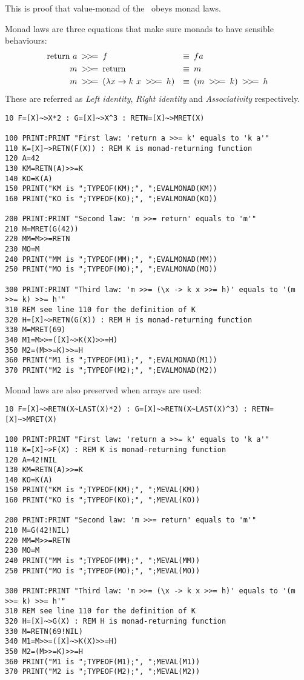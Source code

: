 This is proof that value-monad of the \tbas\ obeys monad laws.

Monad laws are three equations that make sure monads to have sensible behaviours:
\begin{align*}
\text{return}\ a \text{\enskip\basicmbind\enskip}& f &\equiv&\enskip f a\\
m \text{\enskip\basicmbind\enskip}& \text{return} &\equiv&\enskip m\\
m \text{\enskip\basicmbind\enskip}& (\lambda x \rightarrow k\ x \text{\enskip\basicmbind\enskip} h) &\equiv&\enskip (m \text{\enskip\basicmbind\enskip} k) \text{\enskip\basicmbind\enskip} h
\end{align*}
These are referred as \emph{Left identity}, \emph{Right identity} and \emph{Associativity} respectively.

\begin{lstlisting}
10 F=[X]~>X*2 : G=[X]~>X^3 : RETN=[X]~>MRET(X)

100 PRINT:PRINT "First law: 'return a >>= k' equals to 'k a'"
110 K=[X]~>RETN(F(X)) : REM K is monad-returning function
120 A=42
130 KM=RETN(A)>>=K
140 KO=K(A)
150 PRINT("KM is ";TYPEOF(KM);", ";EVALMONAD(KM))
160 PRINT("KO is ";TYPEOF(KO);", ";EVALMONAD(KO))

200 PRINT:PRINT "Second law: 'm >>= return' equals to 'm'"
210 M=MRET(G(42))
220 MM=M>>=RETN
230 MO=M
240 PRINT("MM is ";TYPEOF(MM);", ";EVALMONAD(MM))
250 PRINT("MO is ";TYPEOF(MO);", ";EVALMONAD(MO))

300 PRINT:PRINT "Third law: 'm >>= (\x -> k x >>= h)' equals to '(m >>= k) >>= h'"
310 REM see line 110 for the definition of K
320 H=[X]~>RETN(G(X)) : REM H is monad-returning function
330 M=MRET(69)
340 M1=M>>=([X]~>K(X)>>=H)
350 M2=(M>>=K)>>=H
360 PRINT("M1 is ";TYPEOF(M1);", ";EVALMONAD(M1))
370 PRINT("M2 is ";TYPEOF(M2);", ";EVALMONAD(M2))
\end{lstlisting}

Monad laws are also preserved when arrays are used:

\begin{lstlisting}
10 F=[X]~>RETN(X~LAST(X)*2) : G=[X]~>RETN(X~LAST(X)^3) : RETN=[X]~>MRET(X)

100 PRINT:PRINT "First law: 'return a >>= k' equals to 'k a'"
110 K=[X]~>F(X) : REM K is monad-returning function
120 A=42!NIL
130 KM=RETN(A)>>=K
140 KO=K(A)
150 PRINT("KM is ";TYPEOF(KM);", ";MEVAL(KM))
160 PRINT("KO is ";TYPEOF(KO);", ";MEVAL(KO))

200 PRINT:PRINT "Second law: 'm >>= return' equals to 'm'"
210 M=G(42!NIL)
220 MM=M>>=RETN
230 MO=M
240 PRINT("MM is ";TYPEOF(MM);", ";MEVAL(MM))
250 PRINT("MO is ";TYPEOF(MO);", ";MEVAL(MO))

300 PRINT:PRINT "Third law: 'm >>= (\x -> k x >>= h)' equals to '(m >>= k) >>= h'"
310 REM see line 110 for the definition of K
320 H=[X]~>G(X) : REM H is monad-returning function
330 M=RETN(69!NIL)
340 M1=M>>=([X]~>K(X)>>=H)
350 M2=(M>>=K)>>=H
360 PRINT("M1 is ";TYPEOF(M1);", ";MEVAL(M1))
370 PRINT("M2 is ";TYPEOF(M2);", ";MEVAL(M2))
\end{lstlisting}
